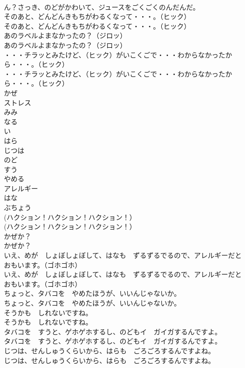 \documentclass[8pt]{extreport}
\begin{document}
\begin{CJK}{UTF8}{min}
\\	ん？さっき、のどがかわいて、ジュースをごくごくのんだんだ。
\\	そのあと、どんどんきもちがわるくなって・・・。（ヒック）
\\	そのあと、どんどんきもちがわるくなって・・・。（ヒック）
\\	あのラベルよまなかったの？（ジロッ）
\\	あのラベルよまなかったの？（ジロッ）
\\	・・・チラッとみたけど、（ヒック）がいこくごで・・・わからなかったから・・・。（ヒック）
\\	・・・チラッとみたけど、（ヒック）がいこくごで・・・わからなかったから・・・。（ヒック）
\\	かぜ
\\	ストレス
\\	みみ
\\	なる
\\	い
\\	はら
\\	じつは
\\	のど
\\	すう
\\	やめる
\\	アレルギー
\\	はな
\\	ぶちょう
\\	(ハクション！ハクション！ハクション！）
\\	(ハクション！ハクション！ハクション！）
\\	かぜか？
\\	かぜか？
\\	いえ、めが　しょぼしょぼして、はなも　ずるずるでるので、アレルギーだと　おもいます。（ゴホゴホ）
\\	いえ、めが　しょぼしょぼして、はなも　ずるずるでるので、アレルギーだと　おもいます。（ゴホゴホ）
\\	ちょっと、タバコを　やめたほうが、いいんじゃないか。
\\	ちょっと、タバコを　やめたほうが、いいんじゃないか。
\\	そうかも　しれないですね。
\\	そうかも　しれないですね。
\\	タバコを　すうと、ゲホゲホするし、のどもイ　ガイガするんですよ。
\\	タバコを　すうと、ゲホゲホするし、のどもイ　ガイガするんですよ。
\\	じつは、せんしゅうくらいから、はらも　ごろごろするんですよね。
\\	じつは、せんしゅうくらいから、はらも　ごろごろするんですよね。

\end{CJK}
\end{document}
